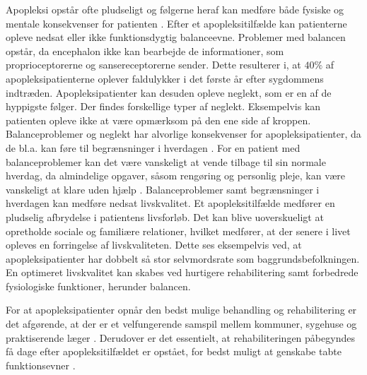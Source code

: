 Apopleksi opstår ofte pludseligt og følgerne heraf kan medføre både fysiske og mentale konsekvenser for patienten \cite{Muus2008}. Efter et apopleksitilfælde kan patienterne opleve nedsat eller ikke funktionsdygtig balanceevne. Problemer med balancen opstår, da encephalon ikke kan bearbejde de informationer, som proprioceptorerne og sansereceptorerne sender. \cite{Karnath2003} Dette resulterer i, at $40\%$ af apopleksipatienterne oplever faldulykker i det første år efter sygdommens indtræden. \cite{Association2006} 
Apopleksipatienter kan desuden opleve neglekt, som er en af de hyppigste følger. Der findes forskellige typer af neglekt. Eksempelvis kan patienten opleve ikke at være opmærksom på den ene side af kroppen. \cite{???} \\
Balanceproblemer og neglekt har alvorlige konsekvenser for apopleksipatienter, da de bl.a. kan føre til begrænsninger i hverdagen \cite{Muus2008,Nichols1997}. For en patient med balanceproblemer kan det være vanskeligt at vende tilbage til sin normale hverdag, da almindelige opgaver, såsom rengøring og personlig pleje, kan være vanskeligt at klare uden hjælp \cite{Sundhedsstyrelsen2010}. Balanceproblemer samt begrænsninger i hverdagen kan medføre nedsat livskvalitet. Et apopleksitilfælde medfører en pludselig afbrydelse i patientens livsforløb. Det kan blive uoverskueligt at opretholde sociale og familiære relationer, hvilket medfører, at der senere i livet opleves en forringelse af livskvaliteten. Dette ses eksempelvis ved, at apopleksipatienter har dobbelt så stor selvmordsrate som baggrundsbefolkningen. \cite{Sundhedsstyrelsen2010} En optimeret livskvalitet kan skabes ved hurtigere rehabilitering samt forbedrede fysiologiske funktioner, herunder balancen. \cite{Sundhedsstyrelsen2010}

For at apopleksipatienter opnår den bedst mulige behandling og rehabilitering er det afgørende, at der er et velfungerende samspil mellem kommuner, sygehuse og praktiserende læger \cite{Sundhedsstyrelsen2010}. Derudover er det essentielt, at rehabiliteringen påbegyndes få dage efter apopleksitilfældet er opstået, for bedst muligt at genskabe tabte funktionsevner \cite{Kruuse2015}. 



